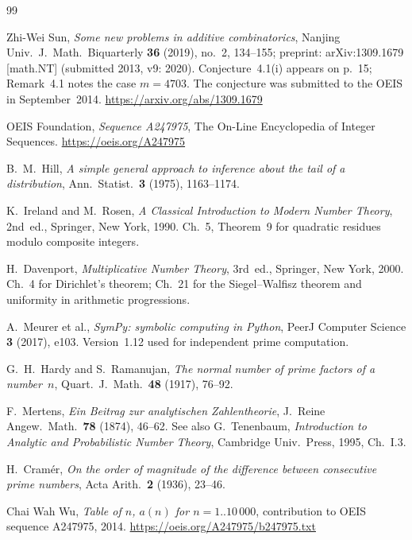 \documentclass[12pt]{article}
\begin{document}
\begin{thebibliography}{99}
	
	Zhi-Wei Sun,
	\textit{Some new problems in additive combinatorics},
	Nanjing Univ.\ J.\ Math.\ Biquarterly \textbf{36} (2019), no.~2,
	134--155; preprint: arXiv:1309.1679 [math.NT] (submitted 2013,
	v9: 2020).
	Conjecture~4.1(i) appears on p.~15; Remark~4.1 notes the case
	$m = 4703$. The conjecture was submitted to the OEIS in
	September~2014.
	\url{https://arxiv.org/abs/1309.1679}
	
	OEIS Foundation,
	\textit{Sequence A247975},
	The On-Line Encyclopedia of Integer Sequences.
	\url{https://oeis.org/A247975}
	
	B.~M.~Hill,
	\textit{A simple general approach to inference about the tail of a
		distribution},
	Ann.\ Statist.\ \textbf{3} (1975), 1163--1174.
	
	K.~Ireland and M.~Rosen,
	\textit{A Classical Introduction to Modern Number Theory},
	2nd~ed., Springer, New York, 1990.
	Ch.~5, Theorem~9 for quadratic residues modulo composite integers.
	
	H.~Davenport,
	\textit{Multiplicative Number Theory},
	3rd~ed., Springer, New York, 2000.
	Ch.~4 for Dirichlet's theorem; Ch.~21 for the Siegel--Walfisz
	theorem and uniformity in arithmetic progressions.
	
	A.~Meurer et al.,
	\textit{SymPy: symbolic computing in Python},
	PeerJ Computer Science \textbf{3} (2017), e103.
	Version~1.12 used for independent prime computation.
	
	G.~H.~Hardy and S.~Ramanujan,
	\textit{The normal number of prime factors of a number~$n$},
	Quart.\ J.\ Math.\ \textbf{48} (1917), 76--92.
	
	F.~Mertens,
	\textit{Ein Beitrag zur analytischen Zahlentheorie},
	J.\ Reine Angew.\ Math.\ \textbf{78} (1874), 46--62.
	See also G.~Tenenbaum,
	\textit{Introduction to Analytic and Probabilistic Number Theory},
	Cambridge Univ.\ Press, 1995, Ch.~I.3.
	
	H.~Cram\'er,
	\textit{On the order of magnitude of the difference between consecutive
		prime numbers},
	Acta Arith.\ \textbf{2} (1936), 23--46.
	
	Chai Wah Wu,
	\textit{Table of $n$, $a(n)$ for $n = 1..10\,000$},
	contribution to OEIS sequence A247975, 2014.
	\url{https://oeis.org/A247975/b247975.txt}
	

\end{thebibliography}
\end{document}
